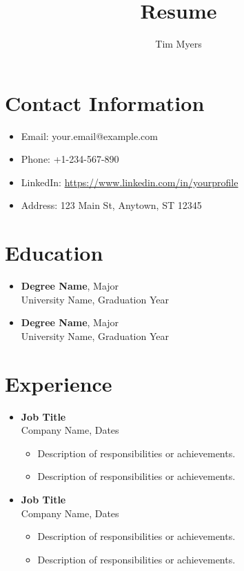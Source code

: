 \documentclass[a4paper,10pt]{article}
\title{Resume}
\author{Tim Myers}
\date{} %
\begin{document}
\maketitle

\section*{Contact Information}
\begin{itemize}
    \item Email: your.email@example.com
    \item Phone: +1-234-567-890
    \item LinkedIn: \url{https://www.linkedin.com/in/yourprofile}
    \item Address: 123 Main St, Anytown, ST 12345
\end{itemize}

\section*{Education}
\begin{itemize}
    \item \textbf{Degree Name}, Major \\
    University Name, Graduation Year
    \item \textbf{Degree Name}, Major \\
    University Name, Graduation Year
\end{itemize}

\section*{Experience}
\begin{itemize}
    \item \textbf{Job Title} \\
    Company Name, Dates \\
    \begin{itemize}
        \item Description of responsibilities or achievements.
        \item Description of responsibilities or achievements.
    \end{itemize}
    
    \item \textbf{Job Title} \\
    Company Name, Dates \\
    \begin{itemize}
        \item Description of responsibilities or achievements.
        \item Description of responsibilities or achievements.
    \end{itemize}
\end{itemize}
\end{document}

